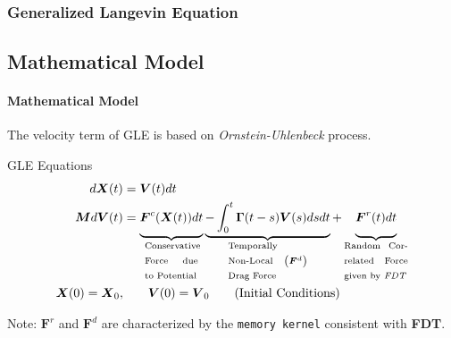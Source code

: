 \documentclass[a4paper,10pt]{beamer}
\newcommand{\BS}[1]{\boldsymbol{#1}}
\newcommand{\rb}[1]{\left( #1 \right)}
\begin{document}
	\begin{frame}
		\small
		\frametitle{Generalized Langevin Equation}
		\subsection{Mathematical Model}
		\framesubtitle{Mathematical Model}
		
		The velocity term of GLE is based on \textit{Ornstein-Uhlenbeck} process.
	
		\begin{block}{GLE Equations}
			\begin{align}
			d\BS{X}(t) &= \BS{V}(t) dt \\
			\BS{M} d\BS{V}(t) &= \underbrace{\vphantom{- \int_{0}^{t} \BS{\Gamma}(t-s) \BS{V}(s) ds dt}\BS{F}^{c}(\BS{X}(t)) dt}_{\text{\centering \begin{minipage}{1.5cm}
					Conservative Force due to Potential
			\end{minipage}}}
			\underbrace{- \int_{0}^{t} \BS{\Gamma}(t-s) \BS{V}(s) ds dt}_{\text{\centering \begin{minipage}{1.5cm}
				Temporally Non-Local Drag Force
				\end{minipage}}\;\rb{\BS{F}^{d}}} + \underbrace{\vphantom{- \int_{0}^{t} \BS{\Gamma}(t-s) \BS{V}(s) ds dt}\BS{F}^{r}(t)dt}_{\text{\begin{minipage}{1.8cm}
				Random Correlated Force given by \textit{FDT}
				\end{minipage}}} \\
			\BS{X}(0) = \BS{X}_{0}, &\qquad \BS{V}(0) = \BS{V}_{0} \qquad (\text{Initial Conditions})
			\end{align}
		\end{block}
		\begin{alertblock}{Note:}
			$\BS{F}^{r}$ and $\BS{F}^{d}$ are characterized by the \texttt{memory kernel} consistent with \textbf{FDT}.
		\end{alertblock}
	\end{frame}
\end{document}

